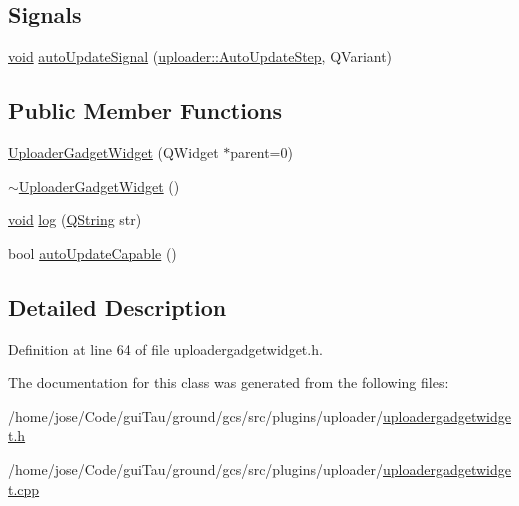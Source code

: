 \subsection*{Signals}
\begin{DoxyCompactItemize}
\item 
\hyperlink{group___u_a_v_objects_plugin_ga444cf2ff3f0ecbe028adce838d373f5c}{void} \hyperlink{group___y_modem_uploader_ga87ead7222452d2bbbbde0f0450ed8c11}{auto\-Update\-Signal} (\hyperlink{namespaceuploader_adb90c08cc33a348c2363c1d7a9626422}{uploader\-::\-Auto\-Update\-Step}, Q\-Variant)
\end{DoxyCompactItemize}
\subsection*{Public Member Functions}
\begin{DoxyCompactItemize}
\item 
\hyperlink{group___y_modem_uploader_ga7065a066176fac2b996efaea8fc29a36}{Uploader\-Gadget\-Widget} (Q\-Widget $\ast$parent=0)
\item 
\hyperlink{group___y_modem_uploader_ga81ab4c8e328f917680b38093e9c69e6c}{$\sim$\-Uploader\-Gadget\-Widget} ()
\item 
\hyperlink{group___u_a_v_objects_plugin_ga444cf2ff3f0ecbe028adce838d373f5c}{void} \hyperlink{group___y_modem_uploader_ga9927716b91171f296e3a3210e372e702}{log} (\hyperlink{group___u_a_v_objects_plugin_gab9d252f49c333c94a72f97ce3105a32d}{Q\-String} str)
\item 
bool \hyperlink{group___y_modem_uploader_gab177e7f52b6bfc0de4547c2e37ca9c56}{auto\-Update\-Capable} ()
\end{DoxyCompactItemize}


\subsection{Detailed Description}


Definition at line 64 of file uploadergadgetwidget.\-h.



The documentation for this class was generated from the following files\-:\begin{DoxyCompactItemize}
\item 
/home/jose/\-Code/gui\-Tau/ground/gcs/src/plugins/uploader/\hyperlink{uploadergadgetwidget_8h}{uploadergadgetwidget.\-h}\item 
/home/jose/\-Code/gui\-Tau/ground/gcs/src/plugins/uploader/\hyperlink{uploadergadgetwidget_8cpp}{uploadergadgetwidget.\-cpp}\end{DoxyCompactItemize}
